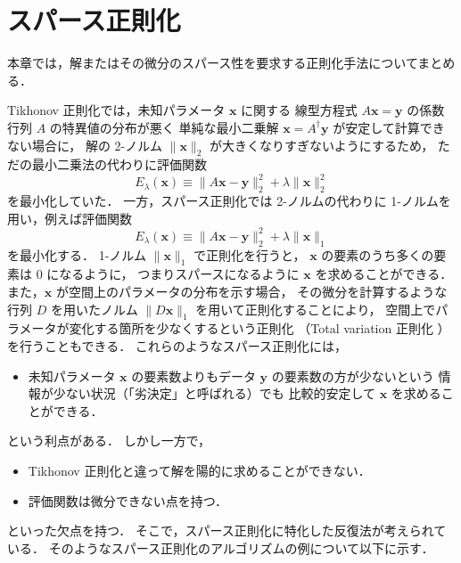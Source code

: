 %

\chapter{スパース正則化}\label{chap:regularization_sparse}

本章では，解またはその微分のスパース性を要求する正則化手法についてまとめる．

Tikhonov 正則化では，未知パラメータ $\bm{x}$ に関する
線型方程式 $A \bm{x} = \bm{y}$ の係数行列 $A$ の特異値の分布が悪く
単純な最小二乗解 $\bm{x} = A^\dagger \bm{y}$ が安定して計算できない場合に，
解の 2-ノルム $\|\bm{x}\|_2$ が大きくなりすぎないようにするため，
ただの最小二乗法の代わりに評価関数
\begin{equation}
    E_{\lambda}(\bm{x}) \equiv \|A \bm{x} - \bm{y}\|_2^2 + \lambda \|\bm{x}\|_2^2
\end{equation}
を最小化していた．
一方，スパース正則化では 2-ノルムの代わりに 1-ノルムを用い，例えば評価関数
\begin{equation}
    E_{\lambda}(\bm{x}) \equiv \|A \bm{x} - \bm{y}\|_2^2 + \lambda \|\bm{x}\|_1
\end{equation}
を最小化する．
1-ノルム $\|\bm{x}\|_1$ で正則化を行うと，
$\bm{x}$ の要素のうち多くの要素は 0 になるように，
つまりスパースになるように $\bm{x}$ を求めることができる．
また，$\bm{x}$ が空間上のパラメータの分布を示す場合，
その微分を計算するような行列 $D$ を用いたノルム $\|D \bm{x}\|_1$ を用いて正則化することにより，
空間上でパラメータが変化する箇所を少なくするという正則化
（Total variation 正則化
）
を行うこともできる．
これらのようなスパース正則化には，
\begin{itemize}
    \item 未知パラメータ $\bm{x}$ の要素数よりもデータ $\bm{y}$ の要素数の方が少ないという
          情報が少ない状況（「劣決定」と呼ばれる）でも
          比較的安定して $\bm{x}$ を求めることができる．
\end{itemize}
という利点がある．
しかし一方で，
\begin{itemize}
    \item Tikhonov 正則化と違って解を陽的に求めることができない．
    \item 評価関数は微分できない点を持つ．
\end{itemize}
といった欠点を持つ．
そこで，スパース正則化に特化した反復法が考えられている．
そのようなスパース正則化のアルゴリズムの例について以下に示す．


